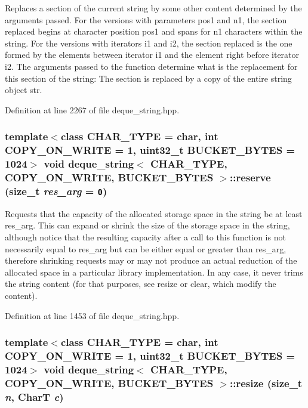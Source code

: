 Replaces a section of the current string by some other content determined by the arguments passed. For the versions with parameters pos1 and n1, the section replaced begins at character position pos1 and spans for n1 characters within the string. For the versions with iterators i1 and i2, the section replaced is the one formed by the elements between iterator i1 and the element right before iterator i2. The arguments passed to the function determine what is the replacement for this section of the string: The section is replaced by a copy of the entire string object str. 

Definition at line 2267 of file deque\_\-string.hpp.\hypertarget{classdeque__string_932f3e6441fcbee5538163dd6d621ea6}{
\subsubsection[{reserve}]{\setlength{\rightskip}{0pt plus 5cm}template$<$class CHAR\_\-TYPE  = char, int COPY\_\-ON\_\-WRITE = 1, uint32\_\-t BUCKET\_\-BYTES = 1024$>$ void {\bf deque\_\-string}$<$ CHAR\_\-TYPE, COPY\_\-ON\_\-WRITE, BUCKET\_\-BYTES $>$::reserve (size\_\-t {\em res\_\-arg} = {\tt 0})}}
\label{classdeque__string_932f3e6441fcbee5538163dd6d621ea6}


Requests that the capacity of the allocated storage space in the string be at least res\_\-arg. This can expand or shrink the size of the storage space in the string, although notice that the resulting capacity after a call to this function is not necessarily equal to res\_\-arg but can be either equal or greater than res\_\-arg, therefore shrinking requests may or may not produce an actual reduction of the allocated space in a particular library implementation. In any case, it never trims the string content (for that purposes, see resize or clear, which modify the content). 

Definition at line 1453 of file deque\_\-string.hpp.\hypertarget{classdeque__string_4a344387975be7a5eebceb58143be0a7}{
\subsubsection[{resize}]{\setlength{\rightskip}{0pt plus 5cm}template$<$class CHAR\_\-TYPE  = char, int COPY\_\-ON\_\-WRITE = 1, uint32\_\-t BUCKET\_\-BYTES = 1024$>$ void {\bf deque\_\-string}$<$ CHAR\_\-TYPE, COPY\_\-ON\_\-WRITE, BUCKET\_\-BYTES $>$::resize (size\_\-t {\em n}, \/  CharT {\em c})}}
\label{classdeque__string_4a344387975be7a5eebceb58143be0a7}


